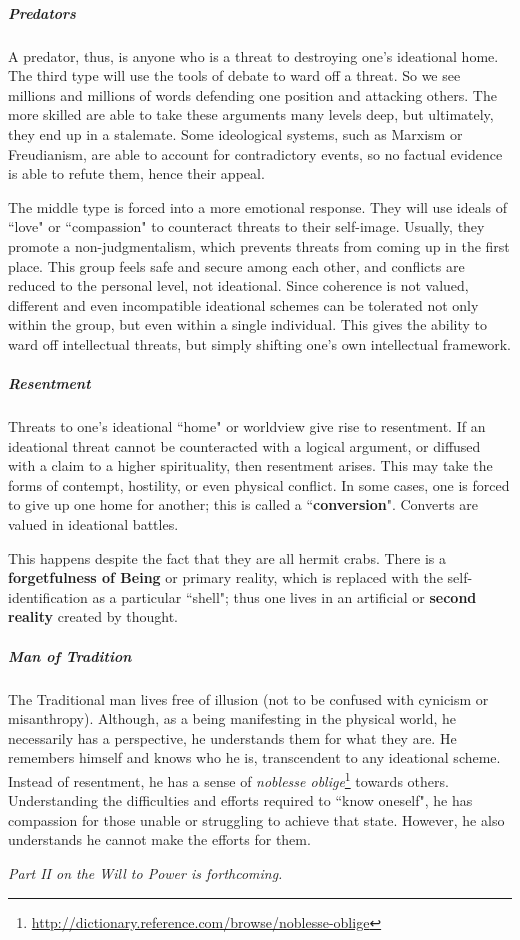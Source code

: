 \subparagraph{Predators}
A predator, thus, is anyone who is a threat to destroying one's ideational home. The third type will use the tools of debate to ward off a threat. So we see millions and millions of words defending one position and attacking others. The more skilled are able to take these arguments many levels deep, but ultimately, they end up in a stalemate. Some ideological systems, such as Marxism or Freudianism, are able to account for contradictory events, so no factual evidence is able to refute them, hence their appeal. 

The middle type is forced into a more emotional response. They will use ideals of ``love" or ``compassion" to counteract threats to their self-image. Usually, they promote a non-judgmentalism, which prevents threats from coming up in the first place. This group feels safe and secure among each other, and conflicts are reduced to the personal level, not ideational. Since coherence is not valued, different and even incompatible ideational schemes can be tolerated not only within the group, but even within a single individual. This gives the ability to ward off intellectual threats, but simply shifting one's own intellectual framework. 

\subparagraph{Resentment}
Threats to one's ideational ``home" or worldview give rise to resentment. If an ideational threat cannot be counteracted with a logical argument, or diffused with a claim to a higher spirituality, then resentment arises. This may take the forms of contempt, hostility, or even physical conflict. In some cases, one is forced to give up one home for another; this is called a ``\textbf{conversion}". Converts are valued in ideational battles. 

This happens despite the fact that they are all hermit crabs. There is a \textbf{forgetfulness of Being} or primary reality, which is replaced with the self-identification as a particular ``shell"; thus one lives in an artificial or \textbf{second reality} created by thought. 

\subparagraph{Man of Tradition}
The Traditional man lives free of illusion (not to be confused with cynicism or misanthropy). Although, as a being manifesting in the physical world, he necessarily has a perspective, he understands them for what they are. He remembers himself and knows who he is, transcendent to any ideational scheme. Instead of resentment, he has a sense of \emph{noblesse oblige}\footnote{\url{http://dictionary.reference.com/browse/noblesse-oblige}} towards others. Understanding the difficulties and efforts required to ``know oneself", he has compassion for those unable or struggling to achieve that state. However, he also understands he cannot make the efforts for them. 

\emph{Part II on the Will to Power is forthcoming.}



